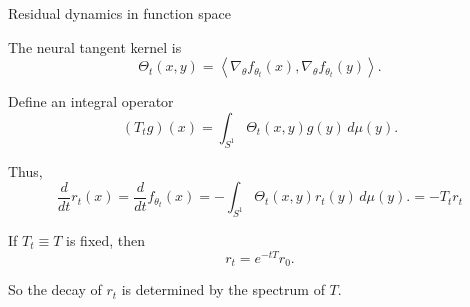 \documentclass[10pt,aspectratio=169]{beamer}
\begin{document}
\begin{frame}{Residual dynamics in function space}

	The neural tangent kernel is
	\[
		\Theta_t(x,y)
		=
		\left\langle
		\nabla_\theta f_{\theta_t}(x),
		\nabla_\theta f_{\theta_t}(y)
		\right\rangle .
	\]

	\pause
	Define an integral operator
	\[
		(T_t g)(x)
		=
		\int_{S^1}
		\Theta_t(x,y)g(y)\,d\mu(y).
	\]

	\pause
	Thus,
	\[
		\frac{d}{dt} r_t(x)
		=
		\frac{d}{dt} f_{\theta_t}(x)
		=
		-
		\int_{S^1}
		\Theta_t(x,y)
		r_t(y)
		\,d\mu(y).
		=
		-T_t r_t
	\]

	If \(T_t\equiv T\) is fixed, then
	\[
		r_t
		=
		e^{-tT}r_0.
	\]

	So the decay of \(r_t\) is determined by the spectrum of \(T\).


\end{frame}
\end{document}
